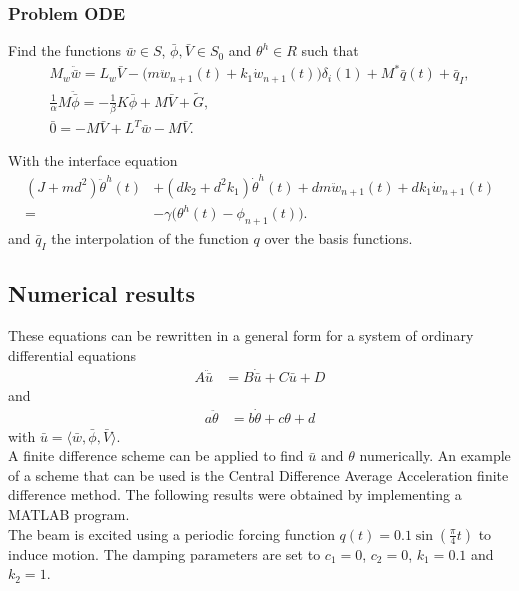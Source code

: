 \documentclass[../../main.tex]{subfiles}
\begin{document}
\subsubsection{Problem ODE}
Find the functions $\bar{w} \in S$, $\bar{\phi}, \bar{V} \in S_0$ and $\theta^h \in R$ such that
\begin{align}
M_w\ddot{\bar{w}} = L_w\bar{V} -\big(m \ddot{w}_{n+1}(t) + k_1 \dot{w}_{n+1}(t) \big)\delta_i(1) + M^* \bar{q}(t) + \bar{q}_I,\\
\label{sys2}
\frac{1}{\alpha} M \ddot{\bar{\phi}} = -\frac{1}{\beta} K\bar{\phi} + M\bar{V} + \tilde{G},\\
\label{sys2.1}
\bar{0} = -M\bar{V} + L^T\bar{w} - M\bar{V}.
\end{align}

With the interface equation
\begin{align} \label{sys3} \nonumber
(J+md^2) \ddot \theta^h(t) &+ (d k_2+ d^2 k_1 ) \dot \theta^h(t)  + dm {\ddot w}_{n+1}(t) +  dk_1 {\dot w}_{n+1}(t)\\
  =&  -\gamma \big(\theta^h(t) - {\phi}_{n+1}(t)\big).
\end{align} and $\bar{q}_I$ the interpolation of the function $q$ over the basis functions.


\subsection{Numerical results}
These equations can be rewritten in a general form for a system of ordinary differential equations
\begin{align}
	A\ddot{\bar{u}} &= B\dot{\bar{u}} + C\bar{u} + D
\end{align}
and
\begin{align}
	a \ddot{\theta} & = b \dot{\theta} + c \theta + d
\end{align} with $\bar{u} = \langle \bar{w}, \bar{\phi}, \bar{V} \rangle$.\\

A finite difference scheme can be applied to find $\bar{u}$ and $\theta$ numerically. An example of a scheme that can be used is the Central Difference Average Acceleration finite difference method. The following results were obtained by implementing a MATLAB program.\\

The beam is excited using a periodic forcing function $q(t) = 0.1 \sin(\frac{\pi}{4}t)$ to induce motion. The damping parameters are set to $c_1 = 0$, $c_2 = 0$, $k_1 = 0.1$ and $k_2 = 1$.
\end{document}
